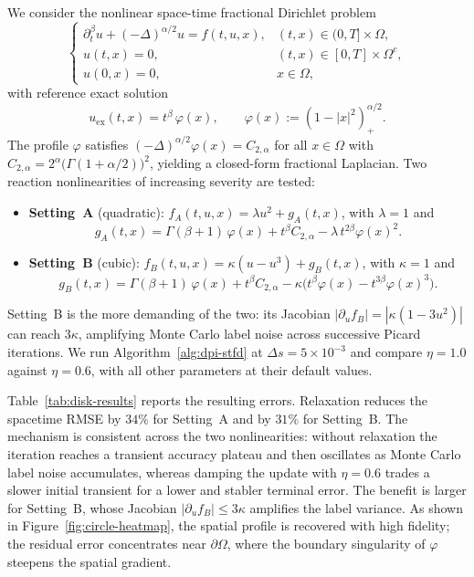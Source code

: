 \documentclass[a4paper,fleqn]{cas-sc}
\begin{document}
We consider the nonlinear space-time fractional Dirichlet problem
\begin{equation}\label{eq:stfd-nl-system}
\begin{cases}
\partial_t^\beta u + (-\Delta)^{\alpha/2} u = f(t,u,x), & (t,x)\in(0,T]\times\Omega,\\
u(t,x)=0, & (t,x)\in[0,T]\times\Omega^c,\\
u(0,x)=0, & x\in\Omega,
\end{cases}
\end{equation}
with reference exact solution
\begin{equation}\label{eq:exact-sol-disk}
u_{\mathrm{ex}}(t,x) = t^\beta\,\varphi(x), \qquad \varphi(x) := (1 - |x|^2)_+^{\alpha/2}.
\end{equation}
The profile $\varphi$ satisfies $(-\Delta)^{\alpha/2}\varphi(x) = C_{2,\alpha}$
for all $x\in\Omega$ with
$C_{2,\alpha} = 2^\alpha\bigl(\Gamma(1+\alpha/2)\bigr)^2$, yielding a
closed-form fractional Laplacian. Two reaction nonlinearities of increasing
severity are tested:
\begin{itemize}
\item \textbf{Setting~A} (quadratic): $f_A(t,u,x) = \lambda u^2 + g_A(t,x)$, with $\lambda=1$ and
\[
g_A(t,x) = \Gamma(\beta{+}1)\,\varphi(x) + t^\beta C_{2,\alpha} - \lambda\,t^{2\beta}\varphi(x)^2.
\]
\item \textbf{Setting~B} (cubic): $f_B(t,u,x) = \kappa(u - u^3) + g_B(t,x)$, with $\kappa=1$ and
\[
g_B(t,x) = \Gamma(\beta{+}1)\,\varphi(x) + t^\beta C_{2,\alpha} - \kappa\bigl(t^\beta\varphi(x) - t^{3\beta}\varphi(x)^3\bigr).
\]
\end{itemize}
Setting~B is the more demanding of the two: its Jacobian
$|\partial_u f_B|=|\kappa(1-3u^2)|$ can reach $3\kappa$, amplifying Monte
Carlo label noise across successive Picard iterations.  We run Algorithm~\ref{alg:dpi-stfd} at $\Delta s=5\times 10^{-3}$ and compare
$\eta=1.0$ against $\eta=0.6$, with all other parameters at their default
values.

Table~\ref{tab:disk-results} reports the resulting errors. Relaxation reduces the spacetime RMSE by $34\%$ for Setting~A and
by $31\%$ for Setting~B. The mechanism is consistent across the two
nonlinearities: without relaxation the iteration reaches a transient accuracy
plateau and then oscillates as Monte Carlo label noise accumulates, whereas
damping the update with $\eta=0.6$ trades a slower initial transient for a
lower and stabler terminal error. The benefit
is larger for Setting~B, whose Jacobian $|\partial_u f_B|\le 3\kappa$
amplifies the label variance. As shown in
Figure~\ref{fig:circle-heatmap}, the spatial profile is recovered with high
fidelity; the residual error concentrates near $\partial\Omega$, where the
boundary singularity of $\varphi$ steepens the spatial gradient.
\end{document}
